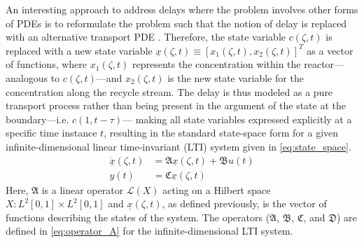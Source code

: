 An interesting approach to address delays where the problem involves other forms of PDEs is to reformulate the problem such that the notion of delay is replaced with an alternative transport PDE \cite{krstic2009book}. 
Therefore, the state variable $c(\zeta,t)$ is replaced with a new state variable $\underline{x}(\zeta, t) \equiv [x_1(\zeta, t), x_2(\zeta, t)]^T$ as a vector of functions, where $x_1(\zeta, t)$ represents the concentration within the reactor—analogous to $c(\zeta,t)$—and $x_2(\zeta, t)$ is the new state variable for the concentration along the recycle stream. The delay is thus modeled as a pure transport process rather than being present in the argument of the state at the boundary—i.e. $c(1,t-\tau)$— making all state variables expressed explicitly at a specific time instance $t$, resulting in the standard state-space form for a given infinite-dimensional linear time-invariant (LTI) system given in \eqref{eq:state_space}.
\begin{equation} \label{eq:state_space}
    \begin{aligned}
        \dot{\underline{x}}(\zeta, t) &= \mathfrak{A} \underline{x}(\zeta, t) + \mathfrak{B} u(t) \\
        y(t) &= \mathfrak{C} \underline{x}(\zeta, t)
    \end{aligned}
\end{equation}
Here, $\mathfrak{A}$ is a linear operator $\mathcal{L}(X)$ acting on a Hilbert space $X: L^2[0,1] \times L^2[0,1]$ and $\underline{x}(\zeta,t)$, as defined previously, is the vector of functions describing the states of the system. The operators ($\mathfrak{A}$, $\mathfrak{B}$, $\mathfrak{C}$, and $\mathfrak{D}$) are defined in \eqref{eq:operator_A} for the infinite-dimensional LTI system.

